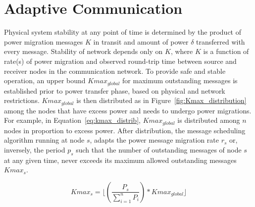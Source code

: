 %
 
\section{Adaptive Communication} 
\label{adap_comm}

Physical system stability at any point of time is determined by the product of power migration messages
$K$ in transit and amount of power $\delta$ transferred with every message. 
Stability of network depends only on $K$, where $K$ is a function of rate(s) of power migration
and observed round-trip time between source and receiver nodes in the communication network.
To provide safe and stable operation, an upper bound $Kmax_{global}$ for maximum outstanding messages 
is established prior to power transfer phase, based on physical and network restrictions. $Kmax_{global}$ 
is then distributed as in Figure~\ref{fig:Kmax_distribution} among the nodes that have excess power 
and needs to undergo power migrations. For example, in Equation~\ref{eq:kmax_distrib}, $Kmax_{global}$ 
is distributed among $n$ nodes in proportion to excess power. After distribution, the message scheduling 
algorithm running at node $s$, adapts the power message migration rate $r_s$ or, inversely, the period 
$p_s$ such that the number of outstanding messages of node $s$ at any given time, never exceeds its 
maximum allowed outstanding messages $Kmax_s$.

\begin{equation}
Kmax_s = \lfloor(\frac{P_s}{\sum_{i=1}^{n} P_i}) * Kmax_{global}\rfloor
\label{eq:kmax_distrib}
\end{equation}

